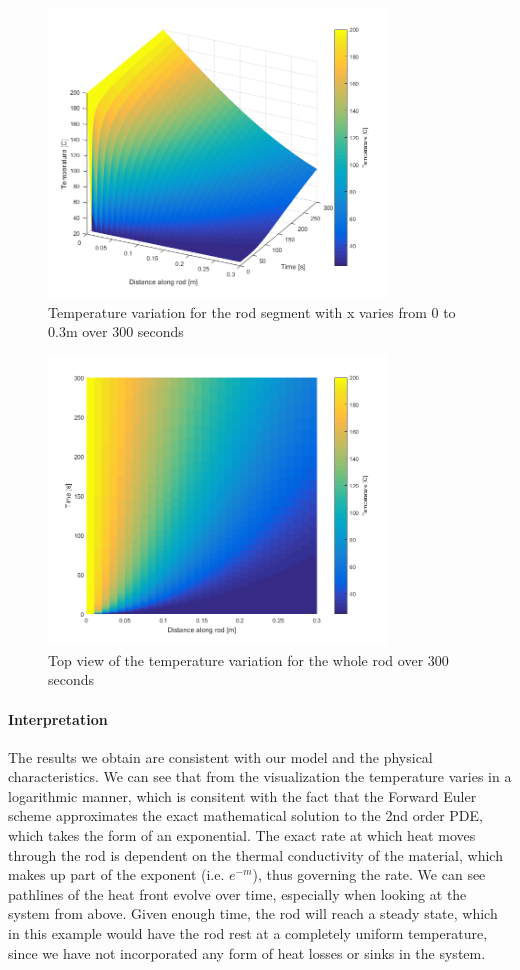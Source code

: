 \begin{figure}[htb]

	\centering
	\includegraphics[width=9cm]{Figures/Heat1D_0_3m.png}       
	\caption{Temperature variation for the rod segment with x varies from 0 to 0.3m over 300 seconds}
	\label{Heat1D_0_3m.fig}
\end{figure}
\clearpage
\begin{figure}[!htb]
	\centering
	\includegraphics[width=9cm]{Figures/Heat1DTop.png}       
	\caption{Top view of the temperature variation for the whole rod over 300 seconds}
	\label{fig:Heat1D_top}
\end{figure}
 
\paragraph{Interpretation}
The results we obtain are consistent with our model and the physical characteristics. We can see that from the visualization the temperature varies in a logarithmic manner, which is 
consitent with the fact that the Forward Euler scheme approximates the exact mathematical solution to the 2nd order PDE, which takes the form of an exponential. The exact rate at which heat moves through the rod is 
dependent on the thermal conductivity of the material, which makes up part of the exponent (i.e. $e^{-m}$), thus governing the rate. 
We can see pathlines of the heat front evolve over time, especially when looking 
at the system from above. Given enough time, the rod will reach a steady state, which in this example would have the rod rest at a completely uniform temperature, since we have not incorporated any form of heat losses or sinks in the system.

